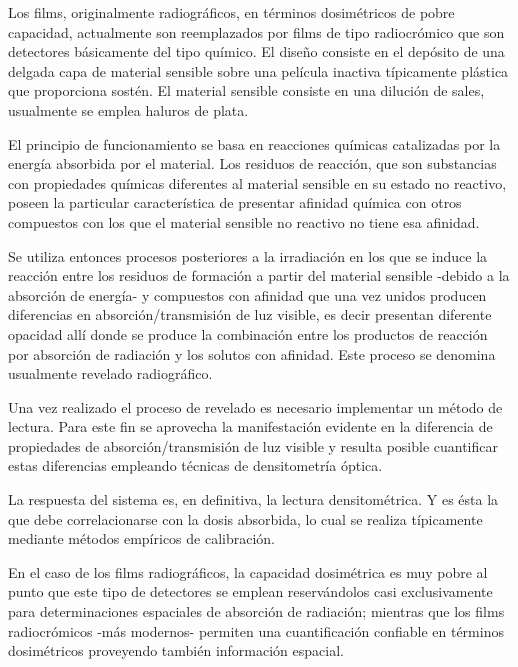 Los films, originalmente radiogr\'aficos, en t\'erminos dosim\'etricos de pobre capacidad, actualmente son reemplazados por films de tipo 
radiocr\'omico que son detectores 
b\'asicamente del tipo qu\'imico. El dise\~no consiste en el dep\'osito de una delgada capa de material sensible sobre una pel\'icula 
inactiva 
t\'ipicamente pl\'astica que proporciona sost\'en. El material sensible consiste en una diluci\'on de sales, usualmente se emplea haluros 
de plata. 
%

%
El principio de funcionamiento se basa en reacciones qu\'imicas catalizadas por la energ\'ia absorbida por el material. Los residuos de 
reacci\'on, que son
substancias con propiedades qu\'imicas diferentes al material sensible en su estado no reactivo, poseen la particular caracter\'istica de 
presentar
afinidad qu\'imica con otros compuestos con los que el material sensible no reactivo no tiene esa afinidad. 
%

%
Se utiliza entonces procesos posteriores a la irradiaci\'on en los que se induce la reacci\'on entre los residuos de formaci\'on a partir 
del material 
sensible -debido a la absorci\'on de energ\'ia- y compuestos con afinidad que una vez unidos producen diferencias en 
absorci\'on/transmisi\'on de luz
visible, es decir presentan diferente opacidad all\'i donde se produce la combinaci\'on entre los productos de reacci\'on por absorci\'on 
de radiaci\'on y
los solutos con afinidad. Este proceso se denomina usualmente revelado radiogr\'afico.
%

%
Una vez realizado el proceso de revelado es necesario implementar un m\'etodo de lectura. Para este fin se aprovecha la manifestaci\'on 
evidente en 
la diferencia de propiedades de absorci\'on/transmisi\'on de luz visible y resulta posible cuantificar estas diferencias empleando 
t\'ecnicas de 
densitometr\'ia \'optica. 
%

%
La respuesta del sistema es, en definitiva, la lectura densitom\'etrica. Y es \'esta la que debe correlacionarse con la dosis absorbida, 
lo cual se realiza
t\'ipicamente mediante m\'etodos emp\'iricos de calibraci\'on. 
%

%
En el caso de los films radiogr\'aficos, la capacidad dosim\'etrica es muy pobre al punto que este tipo de detectores se emplean 
reserv\'andolos casi
exclusivamente para determinaciones espaciales de absorci\'on de radiaci\'on; mientras que los films radiocr\'omicos -m\'as modernos- 
permiten una 
cuantificaci\'on confiable en t\'erminos dosim\'etricos proveyendo tambi\'en informaci\'on espacial.
%

